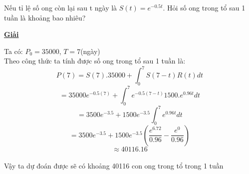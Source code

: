 \documentclass[12pt,a4paper]{article}
\begin{document}
\begin{enumerate}[a/]
\begin{flushleft}
		      Nếu tỉ lệ số ong còn lại sau t ngày là $S(t) = e^{-0.5t}$.
		      Hỏi số ong trong tổ sau 1 tuần là khoảng bao nhiêu?
	      \end{flushleft}
	      \begin{center}
            \textbf{\underline{Giải}}
	      \end{center}
	      \begin{flushleft}
		      Ta có: $P_0=35000$, $T=7$(ngày)\\
		      Theo công thức ta tính được số ong trong tổ sau 1 tuần là: %
		      $$P(7)=S(7).35000 +\int_0^7S(7-t)R(t)dt$$
		      $$=35000e^{-0.5(7)}+ \int_0^7e^{-0.5(7-t)}1500.e^{0.96t}dt$$
		      $$=3500e^{-3.5}+1500e^{-3.5}\int_0^7e^{0.96t}dt$$
		      $$=3500e^{-3.5}+1500e^{-3.5}(\frac{e^{6.72}}{0.96}-\frac{e^0}{0.96})$$
		      $$\approx40116.16$$\\
		      Vậy ta dự đoán được sẽ có khoảng 40116 con ong trong tổ trong 1 tuần
	      \end{flushleft}
\end{enumerate}

\newpage
\end{document}
